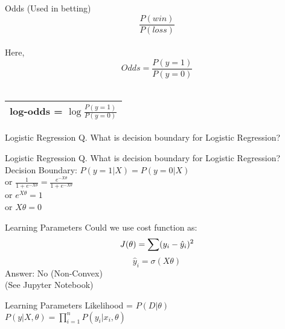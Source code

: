 \documentclass{beamer}
\begin{document}
	\begin{frame}{Odds (Used in betting)}
	    $$\frac{P(win)}{P(loss)}$$ \\
	    \hspace{3cm} Here,\\
	    $$Odds = \frac{P(y = 1)}{P(y = 0)}$$ \\
	    \centering
	    \begin{tabular}{|c|} \hline
        log-odds = $\log\frac{P(y = 1)}{P(y = 0)}$  \\ \hline
        \end{tabular}
	\end{frame}
	\begin{frame}{Logistic Regression}
	    Q. What is decision boundary for Logistic Regression?
	\end{frame}
	\begin{frame}{Logistic Regression}
	    Q. What is decision boundary for Logistic Regression? \\
	    \hspace{0.4cm} Decision Boundary: $P(y = 1|X) = P(y = 0 | X)$\\
	    \vspace{0.3cm}
	    \hspace{4cm} or $\frac{1}{1 + e^{-X\theta}} = \frac{e^{-X\theta}}{1 + e^{-X\theta}}$  \\
	    \vspace{0.3cm}
	    \hspace{4cm} or $e^{X\theta} = 1$\\
	    \vspace{0.3cm}
	    \hspace{4cm} or $X\theta = 0$
	\end{frame}
	\begin{frame}{Learning Parameters}
	    Could we use cost function as:
	    \begin{equation*}
	        J(\theta) = \sum (y_{i} - \hat{y}_{i})^{2}\\
	    \end{equation*}
	    \begin{equation*}
	        \hat{y}_{i} = \sigma(X\theta)
	    \end{equation*}
	    Answer: No (Non-Convex) \\ \hspace{1.2cm} (See Jupyter Notebook)
	\end{frame}
	\begin{frame}{Learning Parameters}
	    Likelihood = $P(D | \theta)$ \\
	    \vspace{0.2cm}
	    $P(y | X, \theta) = \prod_{i=1}^{n} P(y_{i} | x_{i}, \theta)$
	\end{frame}
\end{document}
